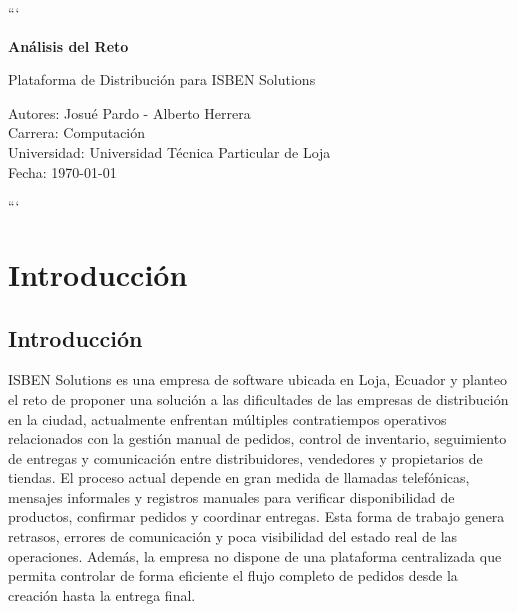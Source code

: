 \documentclass[12pt,a4paper]{report}
\begin{document}
\begin{titlepage}
\centering

```
\vspace*{2cm}

{\Huge\bfseries Análisis del Reto\par}

\vspace{2cm}

{\Large Plataforma de Distribución para ISBEN Solutions\par}

\vfill

\begin{flushright}
    Autores: Josué Pardo - Alberto Herrera\\
    Carrera: Computación\\
    Universidad: Universidad Técnica Particular de Loja\\
    Fecha: \today
\end{flushright}
```

\end{titlepage}

\tableofcontents
\newpage

\chapter{Introducción}

\section{Introducción}
ISBEN Solutions es una empresa de software ubicada en Loja, Ecuador y planteo el reto de proponer una solución a las dificultades de las empresas de distribución en la ciudad, actualmente enfrentan múltiples contratiempos operativos relacionados con la gestión manual de pedidos, control de inventario, seguimiento de entregas y comunicación entre distribuidores, vendedores y propietarios de tiendas.
El proceso actual depende en gran medida de llamadas telefónicas, mensajes informales y registros manuales para verificar disponibilidad de productos, confirmar pedidos y coordinar entregas. Esta forma de trabajo genera retrasos, errores de comunicación y poca visibilidad del estado real de las operaciones.
Además, la empresa no dispone de una plataforma centralizada que permita controlar de forma eficiente el flujo completo de pedidos desde la creación hasta la entrega final.
\end{document}
